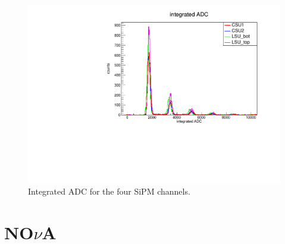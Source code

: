 \documentclass[12pt,a4paper,final]{iopart}
\begin{document}
\begin{figure}
  \centering
  \includegraphics[angle=270,origin=c,width=\textwidth]{figures/integratedADC.pdf}
  \caption{Integrated ADC for the four SiPM channels.}
  \label{fig:cddfadc}
\end{figure}

\section[NOvA]{NO$\nu$A}

%
%
\end{document}
